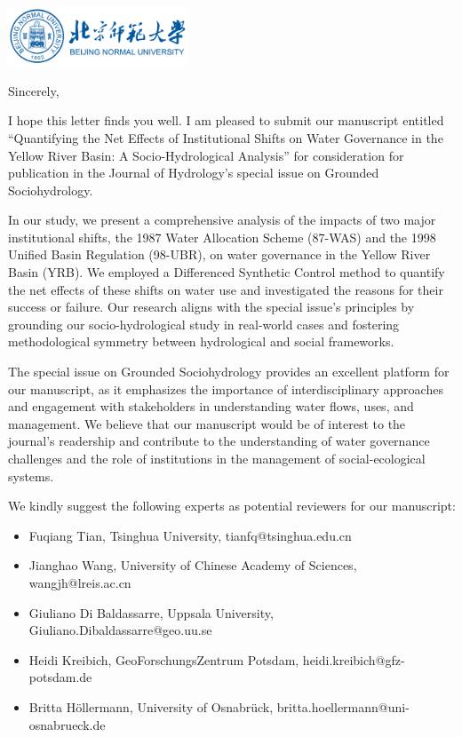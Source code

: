\documentclass[11pt,a4paper,roman]{moderncv}
\begin{document}
\begin{minipage}[t]{\textwidth}
\includegraphics[width=0.40\textwidth]{bnu}
\end{minipage}


\opening{\vspace*{-2em}}
\closing{Sincerely,}{\vspace*{-2em}}
\makelettertitle
\justify

I hope this letter finds you well. I am pleased to submit our manuscript entitled ``Quantifying the Net Effects of Institutional Shifts on Water Governance in the Yellow River Basin: A Socio-Hydrological Analysis'' for consideration for publication in the Journal of Hydrology's special issue on Grounded Sociohydrology.

In our study, we present a comprehensive analysis of the impacts of two major institutional shifts, the 1987 Water Allocation Scheme (87-WAS) and the 1998 Unified Basin Regulation (98-UBR), on water governance in the Yellow River Basin (YRB). We employed a Differenced Synthetic Control method to quantify the net effects of these shifts on water use and investigated the reasons for their success or failure. Our research aligns with the special issue's principles by grounding our socio-hydrological study in real-world cases and fostering methodological symmetry between hydrological and social frameworks.

The special issue on Grounded Sociohydrology provides an excellent platform for our manuscript, as it emphasizes the importance of interdisciplinary approaches and engagement with stakeholders in understanding water flows, uses, and management. We believe that our manuscript would be of interest to the journal's readership and contribute to the understanding of water governance challenges and the role of institutions in the management of social-ecological systems.

We kindly suggest the following experts as potential reviewers for our manuscript:

\begin{itemize}
    \setlength{\itemsep}{0pt}
    \setlength{\parsep}{0pt}
    \setlength{\parskip}{0pt}
    \item Fuqiang Tian, Tsinghua University, tianfq@tsinghua.edu.cn
    \item Jianghao Wang, University of Chinese Academy of Sciences, wangjh@lreis.ac.cn
    \item Giuliano Di Baldassarre, Uppsala University, Giuliano.Dibaldassarre@geo.uu.se
    \item Heidi Kreibich, GeoForschungsZentrum Potsdam, heidi.kreibich@gfz-potsdam.de
    \item Britta Höllermann, University of Osnabrück, britta.hoellermann@uni-osnabrueck.de
\end{itemize}
\end{document}
